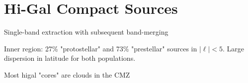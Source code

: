 \section{Hi-Gal Compact Sources}

Single-band extraction with subsequent band-merging

Inner region: 27\% "protostellar" and 73\% "prestellar" sources in $|\ell|<5$.
Large dispersion in latitude for both populations.

Most higal "cores" are clouds in the CMZ